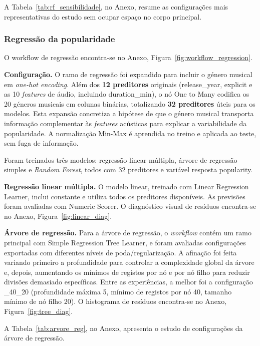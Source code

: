 \documentclass[11pt,a4paper]{article}
\newcommand{\code}[1]{{\ttfamily\hyphenchar\font=45\relax #1}}
\begin{document}
A Tabela~\ref{tab:rf_sensibilidade}, no Anexo, resume as configurações mais representativas do estudo sem ocupar espaço no corpo principal.

\subsubsection{Regressão da popularidade}

O workflow de regressão encontra-se no Anexo, Figura~\ref{fig:workflow_regression}.

\textbf{Configuração.}
O ramo de regressão foi expandido para incluir o género musical em \textit{one-hot encoding}. Além dos \textbf{12 preditores} originais (\code{release\_year}, \code{explicit} e as 10 \textit{features} de áudio, incluindo \code{duration\_min}), o nó \code{One to Many} codifica os 20 géneros musicais em colunas binárias, totalizando \textbf{32 preditores} úteis para os modelos. Esta expansão concretiza a hipótese de que o género musical transporta informação complementar às \textit{features} acústicas para explicar a variabilidade da popularidade. A normalização Min-Max é aprendida no treino e aplicada ao teste, sem fuga de informação.

Foram treinados três modelos: regressão linear múltipla, árvore de regressão simples e \textit{Random Forest}, todos com 32 preditores e variável resposta \code{popularity}.

\textbf{Regressão linear múltipla.}
O modelo linear, treinado com \code{Linear Regression Learner}, inclui constante e utiliza todos os preditores disponíveis. As previsões foram avaliadas com \code{Numeric Scorer}. O diagnóstico visual de resíduos encontra-se no Anexo, Figura~\ref{fig:linear_diag}.

\textbf{Árvore de regressão.}
Para a árvore de regressão, o \textit{workflow} contém um ramo principal com \code{Simple Regression Tree Learner}, e foram avaliadas configurações exportadas com diferentes níveis de poda/regularização. A afinação foi feita variando primeiro a profundidade para controlar a complexidade global da árvore e, depois, aumentando os mínimos de registos por nó e por nó filho para reduzir divisões demasiado específicas. Entre as experiências, a melhor foi a configuração \code{5\_40\_20} (profundidade máxima 5, mínimo de registos por nó 40, tamanho mínimo de nó filho 20). O histograma de resíduos encontra-se no Anexo, Figura~\ref{fig:tree_diag}.

A Tabela~\ref{tab:arvore_reg}, no Anexo, apresenta o estudo de configurações da árvore de regressão.
\end{document}
